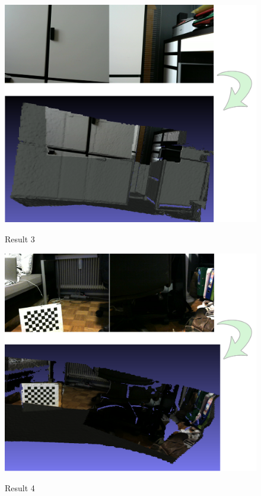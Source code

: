 \begin{figure}
\caption{Result 3}
\centering
    \includegraphics[width=1.0\textwidth]{images/result3.png}
\label{fig:result3}
\end{figure}

\begin{figure}
\caption{Result 4}
\centering
    \includegraphics[width=1.0\textwidth]{images/result4.png}
\label{fig:result4}
\end{figure}

